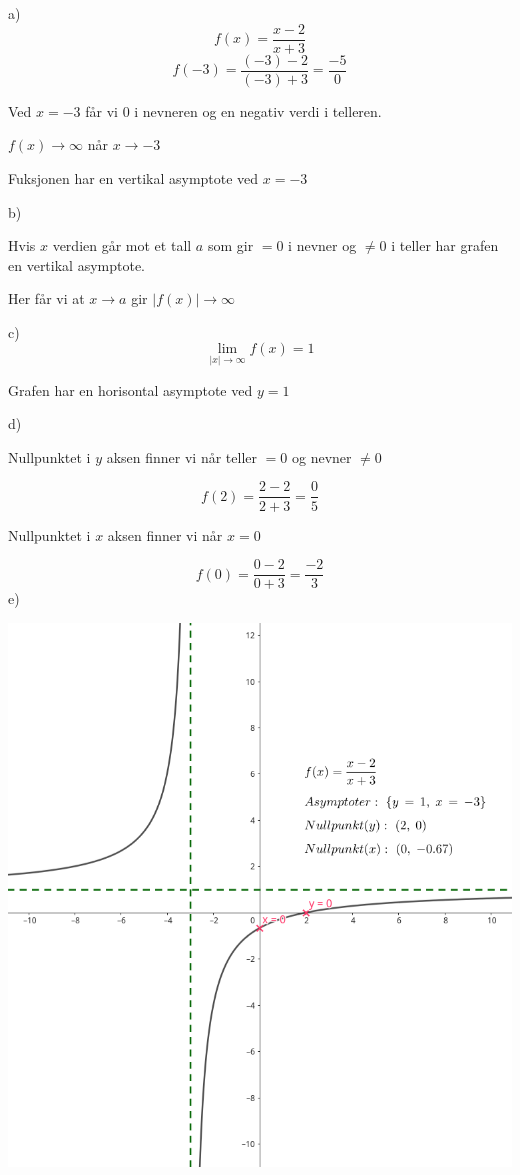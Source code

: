 \documentclass{report}%
\begin{document}
\newpage
\oppg{}
{
a)
$$f(x) = \frac{x - 2}{x + 3}$$
$$f(-3) = \frac{(-3)-2}{(-3)+3} = \frac{-5}{0}$$
\begin{center}Ved $x = -3$ får vi $0$ i nevneren og en negativ verdi i telleren.\end{center}
\begin{center}$f(x)\rightarrow\infty$ når $x \rightarrow -3$\end{center}
\begin{center}Fuksjonen har en vertikal asymptote ved $x = -3$\end{center}
\vspace{0.4cm}
b)
\begin{center}Hvis $x$ verdien går mot et tall $a$ som gir $=0$ i nevner og $\neq0$ i teller har grafen en vertikal asymptote.\end{center}
\begin{center}Her får vi at $x \rightarrow a$ gir $|f(x)| \rightarrow \infty$\end{center}
\vspace{0.4cm}
c)
$$\lim_{|x| \rightarrow \infty} f(x) = 1$$
\begin{center}Grafen har en horisontal asymptote ved $y = 1$\end{center}
\vspace{0.4cm}
d)
\begin{center}Nullpunktet i $y$ aksen finner vi når teller $=0$ og nevner $\neq 0$\end{center}
$$f(2) = \frac{2 - 2}{2 + 3} = \frac{0}{5}$$
\vspace{0.1cm}
\begin{center}Nullpunktet i $x$ aksen finner vi når $x=0$\end{center}
$$f(0) = \frac{0-2}{0+3} = \frac{-2}{3}$$
\vspace{0.4cm}
e)\\
\begin{center}\includegraphics[scale=0.3]{7e.png}\end{center}
}
\end{document}
